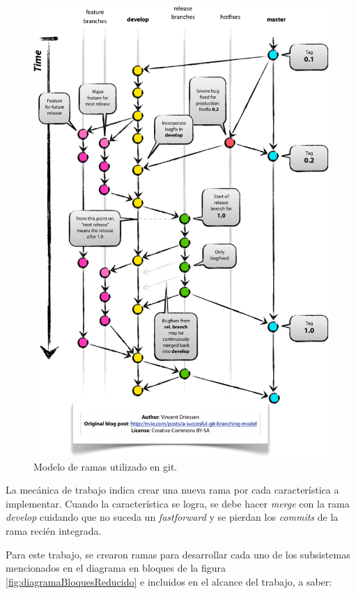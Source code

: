 \begin{figure}[!htbp]
	\centering
	\includegraphics[width=.9\textwidth]{./Figures/Git-branching-model.pdf}
	\caption[Modelo de ramas utilizado en git]{Modelo de ramas utilizado en git\protect\footnotemark.}
	\label{fig:branching}
\end{figure}


La mecánica de trabajo indica crear una nueva rama por cada característica a implementar.  Cuando la característica se logra, se debe hacer \textit{merge} con la rama \textit{develop} cuidando que no suceda un \textit{fastforward} y se pierdan los \textit{commits} de la rama recién integrada.

Para este trabajo, se crearon ramas para desarrollar cada uno de los subsistemas mencionados en el diagrama en bloques de la figura \ref{fig:diagramaBloquesReducido} e incluidos en el alcance del trabajo, a saber:

